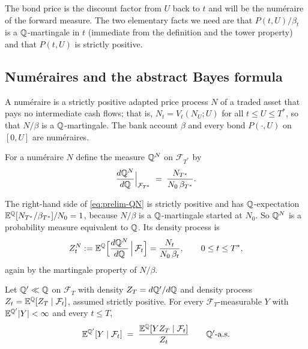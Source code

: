\documentclass[../../../main.tex]{subfiles}
\begin{document}
The bond price is the discount factor from $U$ back to $t$ and will be the num\'eraire of the forward measure. The two elementary facts we need are that $P(t,U)/\beta_t$ is a $\mathbb{Q}$-martingale in $t$ (immediate from the definition and the tower property) and that $P(t,U)$ is strictly positive.

\subsection{Num\'eraires and the abstract Bayes formula}

\begin{definition}\label{def:prelim-numeraire}
A num\'eraire is a strictly positive adapted price process $N$ of a traded asset that pays no intermediate cash flows; that is, $N_t=V_t(N_U;U)$ for all $t\le U\le T^*$, so that $N/\beta$ is a $\mathbb{Q}$-martingale. The bank account $\beta$ and every bond $P(\cdot,U)$ on $[0,U]$ are num\'eraires.
\end{definition}

\begin{definition}\label{def:prelim-Qn}
For a num\'eraire $N$ define the measure $\mathbb{Q}^{N}$ on $\mathcal F_{T^*}$ by
\begin{equation}\label{eq:prelim-QN}
\frac{d\mathbb{Q}^{N}}{d\mathbb{Q}}\Big|_{\mathcal F_{T^*}}\;=\;\frac{N_{T^*}}{N_0\,\beta_{T^*}} .
\end{equation}
\end{definition}

The right-hand side of \eqref{eq:prelim-QN} is strictly positive and has $\mathbb{Q}$-expectation $\mathbb{E}^{\mathbb{Q}}[N_{T^*}/\beta_{T^*}]/N_0=1$, because $N/\beta$ is a $\mathbb{Q}$-martingale started at $N_0$. So $\mathbb{Q}^{N}$ is a probability measure equivalent to $\mathbb{Q}$. Its density process is
\begin{equation}\label{eq:prelim-density}
Z^{N}_t:=\mathbb{E}^{\mathbb{Q}}\Big[\frac{d\mathbb{Q}^{N}}{d\mathbb{Q}}\,\Big|\,\mathcal F_t\Big]=\frac{N_t}{N_0\,\beta_t},\qquad 0\le t\le T^*,
\end{equation}
again by the martingale property of $N/\beta$.

\begin{lemma}\label{lem:prelim-bayes}
Let $\mathbb{Q}'\ll\mathbb{Q}$ on $\mathcal F_{T}$ with density $Z_T=d\mathbb{Q}'/d\mathbb{Q}$ and density process $Z_t=\mathbb{E}^{\mathbb{Q}}[Z_T\mid\mathcal F_t]$, assumed strictly positive. For every $\mathcal F_T$-measurable $Y$ with $\mathbb{E}^{\mathbb{Q}'}|Y|<\infty$ and every $t\le T$,
\[
\mathbb{E}^{\mathbb{Q}'}[Y\mid\mathcal F_t]\;=\;\frac{\mathbb{E}^{\mathbb{Q}}[Y Z_T\mid\mathcal F_t]}{Z_t}\qquad\mathbb{Q}'\text{-a.s.}
\]
\end{lemma}
\end{document}
